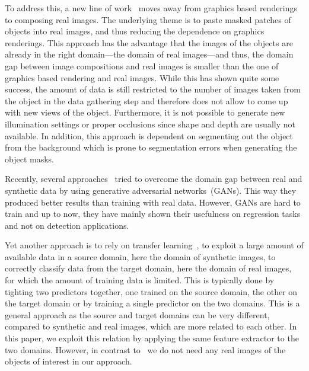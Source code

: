 \documentclass[10pt,twocolumn,letterpaper]{article}
\newcommand{\vincentrmk}[1]{{\color{ForestGreen}\bf #1}}
\newcommand{\stefanrmk}[1]{{\color{DarkRed}\bf #1}}
\newcommand{\paulrmk}[1]{{\color{DarkMagenta}\bf #1}}
\newcommand{\comment}[1]{}
\begin{document}
To address  this, a  new line of  work~\cite{Dwibedi17,Georgakis17,Rad17c} moves
away from  graphics based renderings  to composing real images.   The underlying
theme is to paste masked patches of  objects into real images, and thus reducing
the dependence on graphics renderings.  This approach has the advantage that the
images  of the  objects are  already in  the right  domain---the domain  of real
images---and thus, the domain gap between  image compositions and real images is
smaller than  the one of graphics  based rendering and real  images.  While this
has shown  quite some  success, the amount  of data is  still restricted  to the
number of images taken from the object  in the data gathering step and therefore
does not allow to come up with new  views of the object.  Furthermore, it is not
possible to generate new illumination  settings or proper occlusions since shape
and depth are usually not available.  In addition, this approach is dependent on
segmenting out  the object from  the background  which is prone  to segmentation
errors when generating the object masks.


Recently, several approaches~\cite{Shrivastava16,Bousmalis17}  tried to overcome
the domain gap  between real and synthetic data by  using generative adversarial
networks~(GANs).  This way they produced  better results than training with real
data.  However, GANs  are hard to train  and up to now, they  have mainly shown
their usefulness on regression tasks and not on detection applications.

Yet      another       approach      is      to      rely       on      transfer
learning~\cite{Rozantsev17,bousmalis2016domain,ganin2016domain},  to  exploit  a
large amount of available data in a  source domain, here the domain of synthetic
images, to correctly  classify data from  the target domain,  here the
domain of real images, for which the amount of training data is limited. This is
typically done  by tighting two predictors  together, one trained on  the source
domain, the other on the target domain or by training a
  single predictor on the two domains. This is a general approach as the source
and target domains can be very different, compared to synthetic and real images,
which are more related to each other. In this paper, we exploit this relation by applying
the same feature extractor to the two domains. However, in contrast to~\cite{Rozantsev17,bousmalis2016domain,ganin2016domain} we do not need any real
images of the objects of interest in our approach.
\comment{
\stefanrmk{Actually we need real background images: however we don't need real images containing the objects of interest.}
\paulrmk{Most of the approaches, except for Rozantsev17, use shared
  weights though, so it's really only one predictor.}\vincentrmk{with
  deep learning yes, but not for older papers.}}
\end{document}
